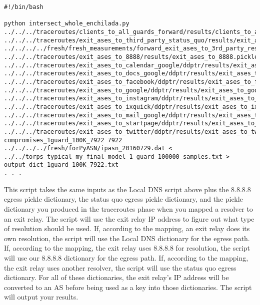 \documentclass{article}
\begin{document}
\begin{lstlisting}[basicstyle=\scriptsize\ttfamily]
#!/bin/bash

python intersect_whole_enchilada.py ../../../traceroutes/clients_to_all_guards_forward/results/clients_to_all_guards_forward_dict.pickle ../../../traceroutes/exit_ases_to_third_party_status_quo/results/exit_ases_to_third_party.pickle ../../../../fresh/fresh_measurements/forward_exit_ases_to_3rd_party_resolvers/final_exit_ip_to_one_resolver_list_dict.pickle ../../../traceroutes/exit_ases_to_8888/results/exit_ases_to_8888.pickle ../../../traceroutes/exit_ases_to_calendar_google/ddptr/results/exit_ases_to_calendar_google_ddptr.pickle ../../../traceroutes/exit_ases_to_docs_google/ddptr/results/exit_ases_to_docs_google_ddptr.pickle ../../../traceroutes/exit_ases_to_facebook/ddptr/results/exit_ases_to_facebook_ddptr.pickle ../../../traceroutes/exit_ases_to_google/ddptr/results/exit_ases_to_google_ddptr.pickle ../../../traceroutes/exit_ases_to_instagram/ddptr/results/exit_ases_to_instagram_ddptr.pickle ../../../traceroutes/exit_ases_to_ixquick/ddptr/results/exit_ases_to_ixquick_ddptr.pickle ../../../traceroutes/exit_ases_to_mail_google/ddptr/results/exit_ases_to_mail_google_ddptr.pickle ../../../traceroutes/exit_ases_to_startpage/ddptr/results/exit_ases_to_startpage_ddptr.pickle ../../../traceroutes/exit_ases_to_twitter/ddptr/results/exit_ases_to_twitter_ddptr.pickle compromises_1guard_100K_7922 7922 ../../../../fresh/forPyASN/ipasn_20160729.dat < ../../torps_typical_my_final_model_1_guard_100000_samples.txt > output_dict_1guard_100K_7922.txt
. . .
\end{lstlisting}
This script
takes the same inputs as the Local DNS script above plus the 8.8.8.8 egress
pickle dictionary, the status quo egress pickle dictionary, and the pickle
dictionary you produced in the traceroutes phase when you mapped a resolver to an
exit relay. The script will use the exit relay IP address to figure out what type of
resolution should be used. If, according to the mapping, an exit relay does its own
resolution, the script will use the Local DNS dictionary for the egress path. If,
according to the mapping, the exit relay uses 8.8.8.8 for resolution, the script will
use our 8.8.8.8 dictionary for the egress path. If, according to the mapping, the exit
relay uses another resolver, the script will use the status quo egress dictionary. For
all of these dictionaries, the exit relay's IP address will be converted to an AS before
being used as a key into those dictionaries. The script will output your results.
\end{document}
